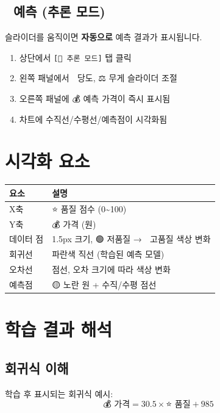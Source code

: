 \documentclass[11pt,a4paper]{article}
\begin{document}
\subsection{🔮 예측 (추론 모드)}

슬라이더를 움직이면 \textbf{자동으로} 예측 결과가 표시됩니다.

\begin{enumerate}
    \item 상단에서 \texttt{[🔮 추론 모드]} 탭 클릭
    \item 왼쪽 패널에서 🍯 당도, ⚖️ 무게 슬라이더 조절
    \item 오른쪽 패널에 💰 예측 가격이 즉시 표시됨
    \item 차트에 수직선/수평선/예측점이 시각화됨
\end{enumerate}

\section{시각화 요소}

\begin{center}
\begin{tabular}{ll}
\toprule
\textbf{요소} & \textbf{설명} \\
\midrule
X축 & ⭐ 품질 점수 (0\textasciitilde100) \\
Y축 & 💰 가격 (원) \\
데이터 점 & 1.5px 크기, 🟢 저품질 → 🔴 고품질 색상 변화 \\
회귀선 & 파란색 직선 (학습된 예측 모델) \\
오차선 & 점선, 오차 크기에 따라 색상 변화 \\
예측점 & 🟡 노란 원 + 수직/수평 점선 \\
\bottomrule
\end{tabular}
\end{center}

\section{학습 결과 해석}

\subsection{회귀식 이해}

학습 후 표시되는 회귀식 예시:
\[
\text{💰 가격} = 30.5 \times \text{⭐ 품질} + 985
\]
\end{document}
